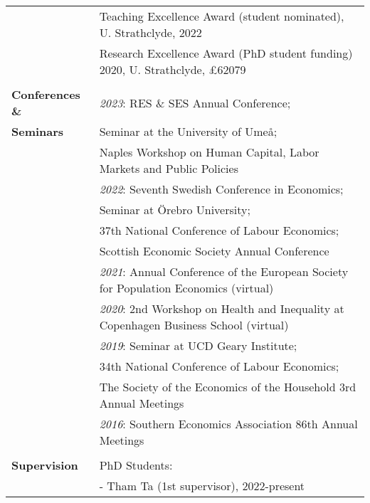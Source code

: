\documentclass[11pt,a4paper]{article}
\begin{document}
\begin{longtable}{l l}
\addlinespace
																												& Teaching Excellence Award (student nominated), U. Strathclyde, 2022   \\									
\addlinespace
																												&  Research Excellence Award (PhD student funding)	 2020, U. Strathclyde, \pounds62079   \\							
                                                        &   \\
\textbf{Conferences \&}             & \textit{2023}: RES \& SES Annual Conference;  \\
\textbf{Seminars}													& \quad \quad \;\; Seminar at the University of Ume{\aa};  \\
																												& \quad \quad \:\: Naples Workshop on Human Capital, Labor Markets and Public Policies \\
\addlinespace
																												&  \textit{2022}: Seventh Swedish Conference in Economics;  \\
																												& \quad \quad \;\; Seminar at \"{O}rebro University;  \\
																												& \quad \quad  \;\; 37th National Conference of Labour Economics;    \\ 
																												&  \quad \quad  \;\; Scottish Economic Society Annual Conference  \\
\addlinespace
																												&  \textit{2021}: Annual Conference of the European Society for Population Economics (virtual)  \\
\addlinespace
																												&  \textit{2020}: 2nd Workshop on Health and Inequality at Copenhagen Business School (virtual)  \\
\addlinespace
																												&  \textit{2019}: Seminar at UCD Geary Institute;   \\
																												&  \quad \quad  \;\; 34th National Conference of Labour Economics;   \\
																												&  \quad \quad  \;\; The Society of the Economics of the Household 3rd Annual Meetings  \\
\addlinespace																												
																												& \textit{2016}: Southern Economics Association 86th Annual Meetings  \\				
																												&  \\
\textbf{Supervision}											&  PhD Students:  \\
																												&  \hspace{0.05cm} - Tham Ta (1st supervisor), 2022-present \\

\end{longtable}
\end{document}
